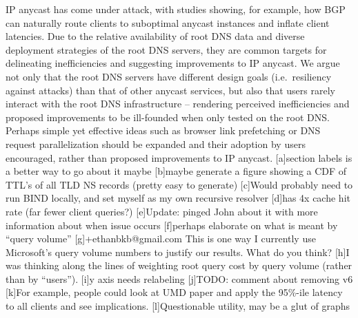 \documentclass[sigconf,nonacm,10pt]{acmart}
\begin{document}
IP anycast has come under attack, with studies showing, for example, how
BGP can naturally route clients to suboptimal anycast instances and
inflate client latencies. Due to the relative availability of root DNS
data and diverse deployment strategies of the root DNS servers, they are
common targets for delineating inefficiencies and suggesting
improvements to IP anycast. We argue not only that the root DNS servers
have different design goals (i.e.~resiliency against attacks) than that
of other anycast services, but also that users rarely interact with the
root DNS infrastructure -- rendering perceived inefficiencies and
proposed improvements to be ill-founded when only tested on the root
DNS. Perhaps simple yet effective ideas such as browser link prefetching
or DNS request parallelization should be expanded and their adoption by
users encouraged, rather than proposed improvements to IP anycast.
{[}a{]}section labels is a better way to go about it maybe {[}b{]}maybe
generate a figure showing a CDF of TTL's of all TLD NS records (pretty
easy to generate) {[}c{]}Would probably need to run BIND locally, and
set myself as my own recursive resolver {[}d{]}has 4x cache hit rate
(far fewer client queries?) {[}e{]}Update: pinged John about it with
more information about when issue occurs {[}f{]}perhaps elaborate on
what is meant by ``query volume'' {[}g{]}+ethanbkb@gmail.com This is one
way I currently use Microsoft's query volume numbers to justify our
results. What do you think? {[}h{]}I was thinking along the lines of
weighting root query cost by query volume (rather than by ``users'').
{[}i{]}y axis needs relabeling {[}j{]}TODO: comment about removing v6
{[}k{]}For example, people could look at UMD paper and apply the
95\%-ile latency to all clients and see implications.
{[}l{]}Questionable utility, may be a glut of graphs


\end{document}
